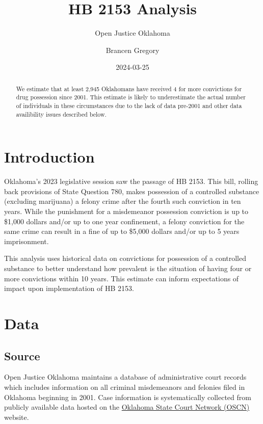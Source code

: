 \documentclass[
  letterpaper,
  DIV=11,
  numbers=noendperiod]{scrartcl}
\title{HB 2153 Analysis}
\subtitle{Open Justice Oklahoma}
\author{Brancen Gregory}
\date{2024-03-25}
\begin{document}
\maketitle
\begin{abstract}
We estimate that at least 2,945 Oklahomans have received 4 for more
convictions for drug possession since 2001. This estimate is likely to
underestimate the actual number of individuals in these circumstances
due to the lack of data pre-2001 and other data availibility issues
described below.
\end{abstract}
\ifdefined\Shaded\renewenvironment{Shaded}{\begin{tcolorbox}[breakable, borderline west={3pt}{0pt}{shadecolor}, interior hidden, enhanced, frame hidden, sharp corners, boxrule=0pt]}{\end{tcolorbox}}\fi

\hypertarget{introduction}{%
\section{Introduction}\label{introduction}}

Oklahoma's 2023 legislative session saw the passage of HB 2153. This
bill, rolling back provisions of State Question 780, makes possession of
a controlled substance (excluding marijuana) a felony crime after the
fourth such conviction in ten years. While the punishment for a
misdemeanor possession conviction is up to \$1,000 dollars and/or up to
one year confinement, a felony conviction for the same crime can result
in a fine of up to \$5,000 dollars and/or up to 5 years imprisonment.

This analysis uses historical data on convictions for possession of a
controlled substance to better understand how prevalent is the situation
of having four or more convictions within 10 years. This estimate can
inform expectations of impact upon implementation of HB 2153.

\hypertarget{data}{%
\section{Data}\label{data}}

\hypertarget{source}{%
\subsection{Source}\label{source}}

Open Justice Oklahoma maintains a database of administrative court
records which includes information on all criminal misdemeanors and
felonies filed in Oklahoma beginning in 2001. Case information is
systematically collected from publicly available data hosted on the
\href{https://www.oscn.net/v4/}{Oklahoma State Court Network (OSCN)}
website.
\end{document}

